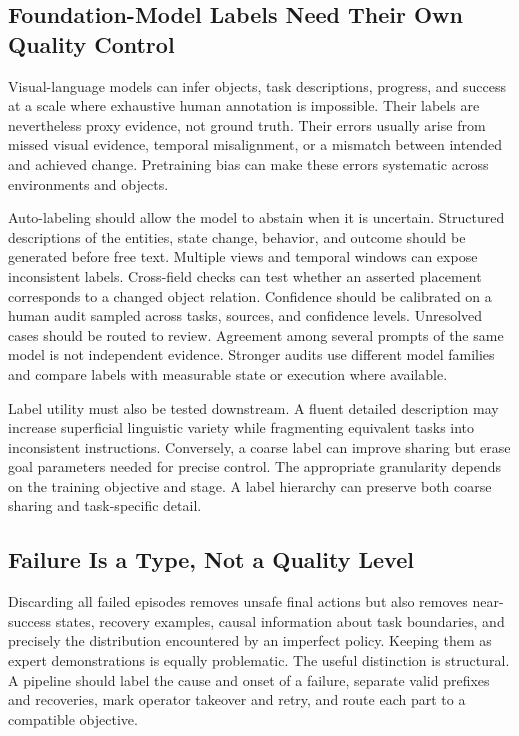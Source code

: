 \subsection{Foundation-Model Labels Need Their Own Quality Control}

Visual-language models can infer objects, task descriptions, progress, and success at a scale where exhaustive human annotation is impossible.
Their labels are nevertheless proxy evidence, not ground truth.
Their errors usually arise from missed visual evidence, temporal misalignment, or a mismatch between intended and achieved change.
Pretraining bias can make these errors systematic across environments and objects.

Auto-labeling should allow the model to abstain when it is uncertain.
Structured descriptions of the entities, state change, behavior, and outcome should be generated before free text.
Multiple views and temporal windows can expose inconsistent labels.
Cross-field checks can test whether an asserted placement corresponds to a changed object relation.
Confidence should be calibrated on a human audit sampled across tasks, sources, and confidence levels.
Unresolved cases should be routed to review.
Agreement among several prompts of the same model is not independent evidence.
Stronger audits use different model families and compare labels with measurable state or execution where available.

Label utility must also be tested downstream.
A fluent detailed description may increase superficial linguistic variety while fragmenting equivalent tasks into inconsistent instructions.
Conversely, a coarse label can improve sharing but erase goal parameters needed for precise control.
The appropriate granularity depends on the training objective and stage.
A label hierarchy can preserve both coarse sharing and task-specific detail.

\subsection{Failure Is a Type, Not a Quality Level}

Discarding all failed episodes removes unsafe final actions but also removes near-success states, recovery examples, causal information about task boundaries, and precisely the distribution encountered by an imperfect policy.
Keeping them as expert demonstrations is equally problematic.
The useful distinction is structural.
A pipeline should label the cause and onset of a failure, separate valid prefixes and recoveries, mark operator takeover and retry, and route each part to a compatible objective.

